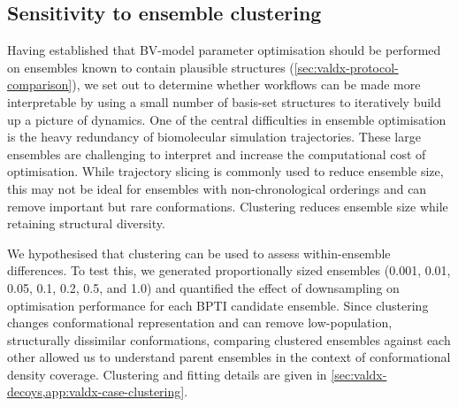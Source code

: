 \subsection{Sensitivity to ensemble clustering}
\label{sec:valdx-clustering-results}

Having established that BV-model parameter optimisation should be performed on ensembles known to contain plausible structures (\cref{sec:valdx-protocol-comparison}), we set out to determine whether workflows can be made more interpretable by using a small number of basis-set structures to iteratively build up a picture of dynamics. One of the central difficulties in ensemble optimisation is the heavy redundancy of biomolecular simulation trajectories. These large ensembles are challenging to interpret and increase the computational cost of optimisation. While trajectory slicing is commonly used to reduce ensemble size, this may not be ideal for ensembles with non-chronological orderings and can remove important but rare conformations. Clustering reduces ensemble size while retaining structural diversity.

We hypothesised that clustering can be used to assess within-ensemble differences. To test this, we generated proportionally sized ensembles (0.001, 0.01, 0.05, 0.1, 0.2, 0.5, and 1.0) and quantified the effect of downsampling on optimisation performance for each BPTI candidate ensemble. Since clustering changes conformational representation and can remove low-population, structurally dissimilar conformations, comparing clustered ensembles against each other allowed us to understand parent ensembles in the context of conformational density coverage. Clustering and fitting details are given in \cref{sec:valdx-decoys,app:valdx-case-clustering}.

